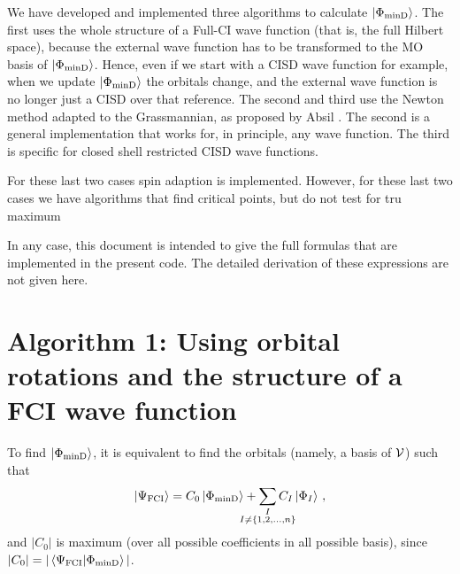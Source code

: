 We have developed and implemented three algorithms to calculate $\ket{\Phi_\text{minD}}$.
The first uses the whole structure of a Full-CI wave function (that is, the full Hilbert space), because the external wave function has to be transformed to the MO basis of $\ket{\Phi_\text{minD}}$.
Hence, even if we start with a CISD wave function for example, when we update $\ket{\Phi_\text{minD}}$ the orbitals change, and the external wave function is no longer just a CISD over that reference.
The second and third use the Newton method adapted to the Grassmannian, as proposed by Absil \etal{} \cite{}.
The second is a general implementation that works for, in principle, any wave function.
The third is specific for closed shell restricted CISD wave functions.

For these last two cases spin adaption is implemented.
However, for these last two cases we have algorithms that find critical points, but do not test for tru maximum

In any case, this document is intended to give the full formulas that are implemented in the present code.
The detailed derivation of these expressions are not given here.


\newpage
\section{Algorithm 1: Using orbital rotations and the structure of a FCI wave function}

To find $\ket{\Phi_\text{minD}}$, it is equivalent to find the orbitals (namely, a basis of $\mathcal{V}{}$) such that 
\begin{equation}
  \ket{\Psi_\text{FCI}} = C_0 \ket{\Phi_\text{minD}} +
  \sum_{
    \mathclap{\substack{I\\
        I \ne \{1,2,\dots,n\}}}
      }
    C_I \ket{\Phi_I}\,,
\end{equation}
and $|C_0|$ is maximum (over all possible coefficients in all possible basis), since $|C_0| = |\innerproduct{\Psi_\text{FCI}}{\Phi_\text{minD}}|$.

